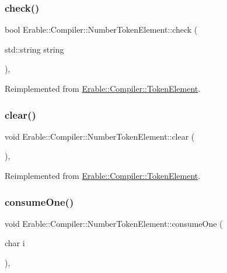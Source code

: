 \subsubsection{\texorpdfstring{check()}{check()}}
{\footnotesize\ttfamily bool Erable\+::\+Compiler\+::\+Number\+Token\+Element\+::check (\begin{DoxyParamCaption}\item[{std\+::string}]{string }\end{DoxyParamCaption})\hspace{0.3cm}{\ttfamily [override]}, {\ttfamily [virtual]}}



Reimplemented from \mbox{\hyperlink{class_erable_1_1_compiler_1_1_token_element_a939f70ed141904d769b6d9f6ecf39cb1}{Erable\+::\+Compiler\+::\+Token\+Element}}.

\mbox{\label{class_erable_1_1_compiler_1_1_number_token_element_addd51ef96a5f6a1129038c03f93b1792}} 
\subsubsection{\texorpdfstring{clear()}{clear()}}
{\footnotesize\ttfamily void Erable\+::\+Compiler\+::\+Number\+Token\+Element\+::clear (\begin{DoxyParamCaption}{ }\end{DoxyParamCaption})\hspace{0.3cm}{\ttfamily [override]}, {\ttfamily [virtual]}}



Reimplemented from \mbox{\hyperlink{class_erable_1_1_compiler_1_1_token_element_a87d2fb14a2920a914fb5aee33324ab9a}{Erable\+::\+Compiler\+::\+Token\+Element}}.

\mbox{\label{class_erable_1_1_compiler_1_1_number_token_element_aa664539cd00997b60350d3ffd9cb1a7a}} 
\subsubsection{\texorpdfstring{consumeOne()}{consumeOne()}}
{\footnotesize\ttfamily void Erable\+::\+Compiler\+::\+Number\+Token\+Element\+::consume\+One (\begin{DoxyParamCaption}\item[{char}]{i }\end{DoxyParamCaption})\hspace{0.3cm}{\ttfamily [override]}, {\ttfamily [virtual]}}



